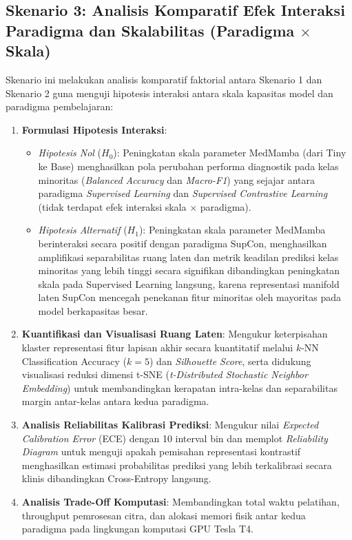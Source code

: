 \subsection{Skenario 3: Analisis Komparatif Efek Interaksi Paradigma dan Skalabilitas (Paradigma \texorpdfstring{$\times$}{x} Skala)}
Skenario ini melakukan analisis komparatif faktorial antara Skenario 1 dan Skenario 2 guna menguji hipotesis interaksi antara skala kapasitas model dan paradigma pembelajaran:
\begin{enumerate}[noitemsep]
	\item \textbf{Formulasi Hipotesis Interaksi}:
	\begin{itemize}[noitemsep]
		\item \textit{Hipotesis Nol} ($H_0$): Peningkatan skala parameter MedMamba (dari Tiny ke Base) menghasilkan pola perubahan performa diagnostik pada kelas minoritas (\textit{Balanced Accuracy} dan \textit{Macro-F1}) yang sejajar antara paradigma \textit{Supervised Learning} dan \textit{Supervised Contrastive Learning} (tidak terdapat efek interaksi skala $\times$ paradigma).
		\item \textit{Hipotesis Alternatif} ($H_1$): Peningkatan skala parameter MedMamba berinteraksi secara positif dengan paradigma SupCon, menghasilkan amplifikasi separabilitas ruang laten dan metrik keadilan prediksi kelas minoritas yang lebih tinggi secara signifikan dibandingkan peningkatan skala pada Supervised Learning langsung, karena representasi manifold laten SupCon mencegah penekanan fitur minoritas oleh mayoritas pada model berkapasitas besar.
	\end{itemize}
	\item \textbf{Kuantifikasi dan Visualisasi Ruang Laten}: Mengukur keterpisahan klaster representasi fitur lapisan akhir secara kuantitatif melalui $k$-NN Classification Accuracy ($k=5$) dan \textit{Silhouette Score}, serta didukung visualisasi reduksi dimensi t-SNE (\textit{t-Distributed Stochastic Neighbor Embedding}) untuk membandingkan kerapatan intra-kelas dan separabilitas margin antar-kelas antara kedua paradigma.
	\item \textbf{Analisis Reliabilitas Kalibrasi Prediksi}: Mengukur nilai \textit{Expected Calibration Error} (ECE) dengan 10 interval bin dan memplot \textit{Reliability Diagram} untuk menguji apakah pemisahan representasi kontrastif menghasilkan estimasi probabilitas prediksi yang lebih terkalibrasi secara klinis dibandingkan Cross-Entropy langsung.
	\item \textbf{Analisis Trade-Off Komputasi}: Membandingkan total waktu pelatihan, throughput pemrosesan citra, dan alokasi memori fisik antar kedua paradigma pada lingkungan komputasi GPU Tesla T4.
\end{enumerate}

